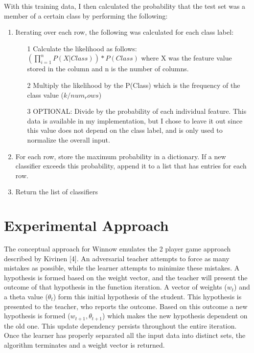 \documentclass[11pt]{article}
\begin{document}
With this training data, I then calculated the probability that the test set was a member of a certain class by performing the following:
\begin{enumerate}

\item Iterating over each row, the following was calculated for each class label:
\begin{enumerate}
\item[1] Calculate the likelihood as follows:
$(\prod_{i=1}^{n} P(X|Class))*P(Class)$ where X was the feature value stored in the column and n is the number of columns.
\item[2] Multiply the likelihood by the P(Class) which is the frequency of the class value ($k/num_rows$)
\item[3] OPTIONAL: Divide by the probability of each individual feature. This data is available in my implementation, but I chose to leave it out since this value does not depend on the class label, and is only used to normalize the overall input.
\end{enumerate}
\item For each row, store the maximum probability in a dictionary. If a new classifier exceeds this probability, append it to a list that has entries for each row.
\item Return the list of classifiers
\end{enumerate}

\section{Experimental Approach}

The conceptual approach for Winnow emulates the 2 player game approach described by Kivinen [4]. An adversarial teacher attempts to force as many mistakes as possible, while the learner attempts to minimize these mistakes. A hypothesis is formed based on the weight vector, and the teacher will present the outcome of that hypothesis in the function iteration. A vector of weights ($w_t$) and a theta value ($\theta_t$) form this initial hypothesis of the student. This hypothesis is presented to the teacher, who reports the outcome. Based on this outcome a new hypothesis is formed ($w_{t+1},\theta_{t+1}$) which makes the new hypothesis dependent on the old one. This update dependency persists throughout the entire iteration. Once the learner has properly separated all the input data into distinct sets, the algorithm terminates and a weight vector is returned.
\end{document}
